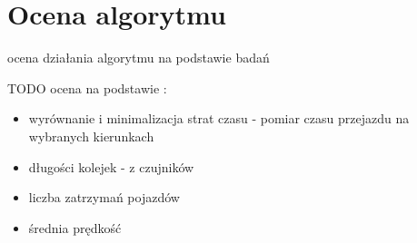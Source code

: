 \chapter{Ocena algorytmu}
\label{chap:ocena}
ocena działania algorytmu na podstawie badań

TODO ocena na podstawie \cite{kawalec+sobieszuk-durka}:
\begin{itemize}
\item wyrównanie i minimalizacja strat czasu - pomiar czasu przejazdu na wybranych kierunkach
\item długości kolejek - z czujników
\item liczba zatrzymań pojazdów
\item średnia prędkość
\end{itemize}
